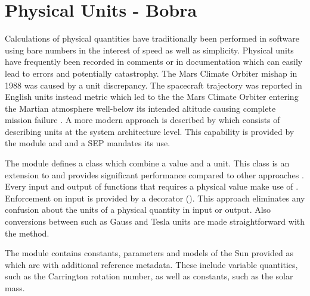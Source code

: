 \section{Physical Units - Bobra}
\label{sec:units}


Calculations of physical quantities have traditionally been performed in software 
using bare numbers in the interest of speed as well as simplicity. Physical units
have frequently been recorded in comments or in documentation which can easily lead
to errors and potentially catastrophy. The Mars Climate Orbiter mishap in 1988 was caused by a unit discrepancy. The spacecraft trajectory was reported in English units instead metric which led to the the Mars Climate Orbiter entering the Martian atmosphere well-below its intended altitude causing complete mission failure \citep{mco_mishap_report}. A more modern approach is described by \citep{Damevski2009}
which consists of describing units at the system architecture level. This capability 
is provided by the  module and and a SEP mandates its use.

The  module defines a  class which combine a value and a unit. This class is an extension to  and provides significant performance compared to other approaches . Every input and output of \sunpypkg functions that requires a physical value make use of . Enforcement on input is provided by a decorator (). This approach eliminates any confusion about the units of a physical quantity in input or output. Also conversions between such as Gauss and Tesla units are made straightforward with the  method.

The  module contains constants, parameters and models of the Sun provided as  which are  with additional reference metadata. These include variable quantities, such as the Carrington rotation number, as well as constants, such as the solar mass. 


